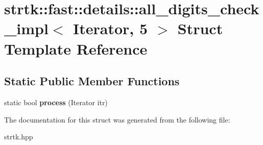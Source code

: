 \hypertarget{structstrtk_1_1fast_1_1details_1_1all__digits__check__impl_3_01Iterator_00_015_01_4}{\section{strtk\-:\-:fast\-:\-:details\-:\-:all\-\_\-digits\-\_\-check\-\_\-impl$<$ Iterator, 5 $>$ Struct Template Reference}
\label{structstrtk_1_1fast_1_1details_1_1all__digits__check__impl_3_01Iterator_00_015_01_4}
}
\subsection*{Static Public Member Functions}
\begin{DoxyCompactItemize}
\item 
\hypertarget{structstrtk_1_1fast_1_1details_1_1all__digits__check__impl_3_01Iterator_00_015_01_4_a560a7f43b102c9143003975c5fcad96d}{static bool {\bfseries process} (Iterator itr)}\label{structstrtk_1_1fast_1_1details_1_1all__digits__check__impl_3_01Iterator_00_015_01_4_a560a7f43b102c9143003975c5fcad96d}

\end{DoxyCompactItemize}


The documentation for this struct was generated from the following file\-:\begin{DoxyCompactItemize}
\item 
strtk.\-hpp\end{DoxyCompactItemize}
